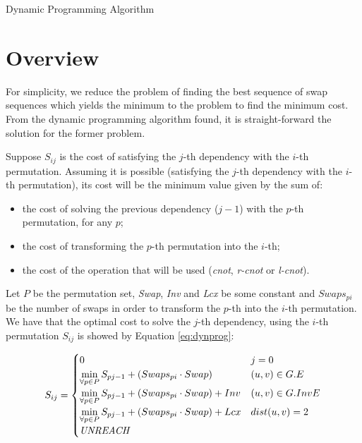 \documentclass[paper=a4, fontsize=12pt]{scrartcl}
\begin{document}
	\begin{center}
		\Large Dynamic Programming Algorithm
	\end{center}

	\section{Overview}
	For simplicity, we reduce the problem of finding the best sequence of swap sequences which yields the minimum to the problem to find the minimum cost. From the dynamic programming algorithm found, it is straight-forward the solution for the former problem.
	
	Suppose $S_{ij}$ is the cost of satisfying the $j$-th dependency with the $i$-th permutation. Assuming it is possible (satisfying the $j$-th dependency with the $i$-th permutation), its cost will be the minimum value given by the sum of:
	
	\begin{itemize}
		\item the cost of solving the previous dependency ($j-1$) with the $p$-th permutation, for any $p$;
		
		\item the cost of transforming the $p$-th permutation into the $i$-th;
		
		\item the cost of the operation that will be used (\textit{cnot}, \textit{r-cnot} or \textit{l-cnot}).
	\end{itemize}

	Let $P$ be the permutation set, \textit{Swap}, \textit{Inv} and \textit{Lcx} be some constant and $Swaps_{pi}$ be the number of swaps in order to transform the $p$-th into the $i$-th permutation. We have that the optimal cost to solve the $j$-th dependency, using the $i$-th permutation $S_{ij}$ is showed by Equation \ref{eq:dynprog}:
	
	\begin{equation}
	\label{eq:dynprog}
	S_{ij}	=
	\begin{cases}
	0 & j = 0 \\
	\displaystyle\min_{\forall p \in P}{S_{pj-1} + (Swaps_{pi} \cdot Swap)} & (u,v) \in G.E \\
	\displaystyle\min_{\forall p \in P}{S_{pj-1} + (Swaps_{pi} \cdot Swap)} + Inv & (u,v) \in G.InvE \\
	\displaystyle\min_{\forall p \in P}{S_{pj-1} + (Swaps_{pi} \cdot Swap)} + Lcx & dist(u,v) = 2 \\
	\textrm{\textit{UNREACH}} &
	\end{cases}
	\end{equation}
	
\end{document}
